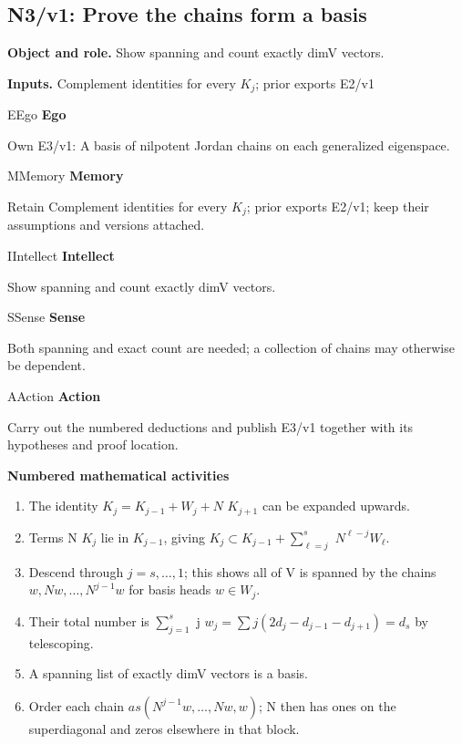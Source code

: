 \documentclass[preprint,12pt,aps,pra,showkeys,amsmath,amssymb,superscriptaddress,floatfix]{revtex4-2}
\theoremstyle{definition}
\theoremstyle{remark}
\newcommand{\mmfaculty}[3]{%
 \begin{mmfacultybox}{#1}{#2}
 {\sffamily\bfseries\color{MMBlue}#2}\par\smallskip #3
 \end{mmfacultybox}}
\newcommand{\field}[2]{\par\smallskip\noindent\textbf{#1.} #2\par}
\begin{document}
\subsection{N3/v1: Prove the chains form a basis}

\field{Object and role}{Show spanning and count exactly dimV vectors.}

\field{Inputs}{Complement identities for every \(K_j\); prior exports E2/v1}

\mmfaculty{E}{Ego}{Own E3/v1: A basis of nilpotent Jordan chains on each generalized
eigenspace.}

\mmfaculty{M}{Memory}{Retain Complement identities for every \(K_j\); prior exports E2/v1;
keep their assumptions and versions attached.}

\mmfaculty{I}{Intellect}{Show spanning and count exactly dimV vectors.}

\mmfaculty{S}{Sense}{Both spanning and exact count are needed; a collection of chains may
otherwise be dependent.}

\mmfaculty{A}{Action}{Carry out the numbered deductions and publish E3/v1 together with its
hypotheses and proof location.}

\smallskip\noindent\textbf{Numbered mathematical activities}

\begin{enumerate}[label=N3.\arabic*,leftmargin=3.4em]

\item The identity \(K_j=K_{j-1}+W_j+N\) \(K_{j+1}\) can be expanded upwards.

\item Terms N \(K_j\) lie in \(K_{j-1}\), giving
\(K_j\subset K_{j-1}+\sum _{\ell =j}^s\) \(N^{\ell -j}W_\ell\).

\item Descend through \(j=s,\ldots ,1\); this shows all of V is spanned by the
chains \(w,Nw,\ldots ,N^{j-1}w\) for basis heads \(w\in W_j\).

\item Their total number is \(\sum _{j=1}^s\) j
\(w_j=\sum j(2d_j-d_{j-1}-d_{j+1})=d_s\) by telescoping.

\item A spanning list of exactly dimV vectors is a basis.

\item Order each chain \(as(N^{j-1}w,\ldots ,Nw,w)\); N then has ones on the
superdiagonal and zeros elsewhere in that block.

\end{enumerate}
\end{document}
